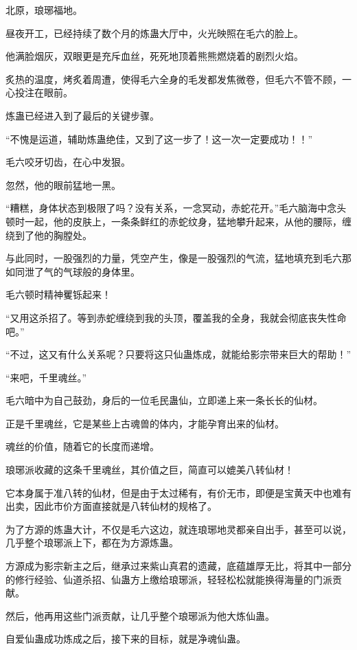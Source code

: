 
\begin{this_body}

北原，琅琊福地。

昼夜开工，已经持续了数个月的炼蛊大厅中，火光映照在毛六的脸上。

他满脸烟灰，双眼更是充斥血丝，死死地顶着熊熊燃烧着的剧烈火焰。

炙热的温度，烤炙着周遭，使得毛六全身的毛发都发焦微卷，但毛六不管不顾，一心投注在眼前。

炼蛊已经进入到了最后的关键步骤。

“不愧是运道，辅助炼蛊绝佳，又到了这一步了！这一次一定要成功！！”

毛六咬牙切齿，在心中发狠。

忽然，他的眼前猛地一黑。

“糟糕，身体状态到极限了吗？没有关系，一念冥动，赤蛇花开。”毛六脑海中念头顿时一起，他的皮肤上，一条条鲜红的赤蛇纹身，猛地攀升起来，从他的腰际，缠绕到了他的胸膛处。

与此同时，一股强烈的力量，凭空产生，像是一股强烈的气流，猛地填充到毛六那如同泄了气的气球般的身体里。

毛六顿时精神矍铄起来！

“又用这杀招了。等到赤蛇缠绕到我的头顶，覆盖我的全身，我就会彻底丧失性命吧。”

“不过，这又有什么关系呢？只要将这只仙蛊炼成，就能给影宗带来巨大的帮助！”

“来吧，千里魂丝。”

毛六暗中为自己鼓劲，身后的一位毛民蛊仙，立即递上来一条长长的仙材。

正是千里魂丝，它是某些上古魂兽的体内，才能孕育出来的仙材。

魂丝的价值，随着它的长度而递增。

琅琊派收藏的这条千里魂丝，其价值之巨，简直可以媲美八转仙材！

它本身属于准八转的仙材，但是由于太过稀有，有价无市，即便是宝黄天中也难有出卖，因此市价方面直接就是八转仙材的规格了。

为了方源的炼蛊大计，不仅是毛六这边，就连琅琊地灵都亲自出手，甚至可以说，几乎整个琅琊派上下，都在为方源炼蛊。

方源成为影宗新主之后，继承过来紫山真君的遗藏，底蕴雄厚无比，将其中一部分的修行经验、仙道杀招、仙蛊方上缴给琅琊派，轻轻松松就能换得海量的门派贡献。

然后，他再用这些门派贡献，让几乎整个琅琊派为他大炼仙蛊。

自爱仙蛊成功炼成之后，接下来的目标，就是净魂仙蛊。


\end{this_body}

